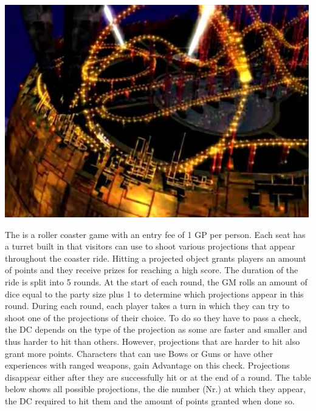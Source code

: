 %
%
%
%
%
%
%
\begin{center} \includegraphics[width=\columnwidth]{./art/goldsaucer/shootingcoaster.jpg} \end{center}
The  is a roller coaster game with an entry fee of 1 GP per person.
Each seat has a turret built in that visitors can use to shoot various projections that appear throughout the coaster ride.
Hitting a projected object grants players an amount of points and they receive prizes for reaching a high score.
The duration of the ride is split into 5 rounds. 
At the start of each round, the GM rolls an amount of dice equal to the party size plus 1 to determine which projections appear in this round. 
During each round, each player takes a turn in which they can try to shoot one of the projections of their choice.
To do so they have to pass a check, the DC depends on the type of the projection as some are faster and smaller and thus harder to hit than others. 
However, projections that are harder to hit also grant more points.
Characters that can use Bows or Guns or have other experiences with ranged weapons, gain Advantage on this check.
Projections disappear either after they are successfully hit or at the end of a round.
The table below shows all possible projections, the die number (Nr.) at which they appear, the DC required to hit them and the amount of points granted when done so.
